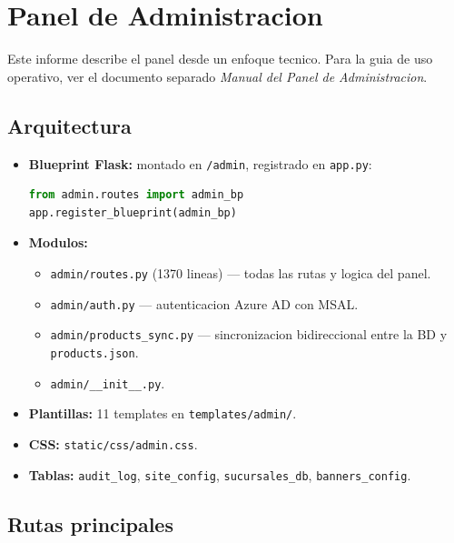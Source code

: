 \documentclass[11pt,a4paper]{article}
\begin{document}
\section{Panel de Administracion}

Este informe describe el panel desde un enfoque tecnico. Para la guia de
uso operativo, ver el documento separado
\textit{Manual del Panel de Administracion}.

\subsection{Arquitectura}

\begin{itemize}[leftmargin=*]
    \item \textbf{Blueprint Flask:} montado en \texttt{/admin}, registrado
        en \texttt{app.py}:
\begin{lstlisting}[language=Python]
from admin.routes import admin_bp
app.register_blueprint(admin_bp)
\end{lstlisting}
    \item \textbf{Modulos:}
    \begin{itemize}
        \item \texttt{admin/routes.py} (1370 lineas) --- todas las rutas y
            logica del panel.
        \item \texttt{admin/auth.py} --- autenticacion Azure AD con MSAL.
        \item \texttt{admin/products\_sync.py} --- sincronizacion bidireccional
            entre la BD y \texttt{products.json}.
        \item \texttt{admin/\_\_init\_\_.py}.
    \end{itemize}
    \item \textbf{Plantillas:} 11 templates en \texttt{templates/admin/}.
    \item \textbf{CSS:} \texttt{static/css/admin.css}.
    \item \textbf{Tablas:} \texttt{audit\_log}, \texttt{site\_config},
        \texttt{sucursales\_db}, \texttt{banners\_config}.
\end{itemize}

\subsection{Rutas principales}
\end{document}
